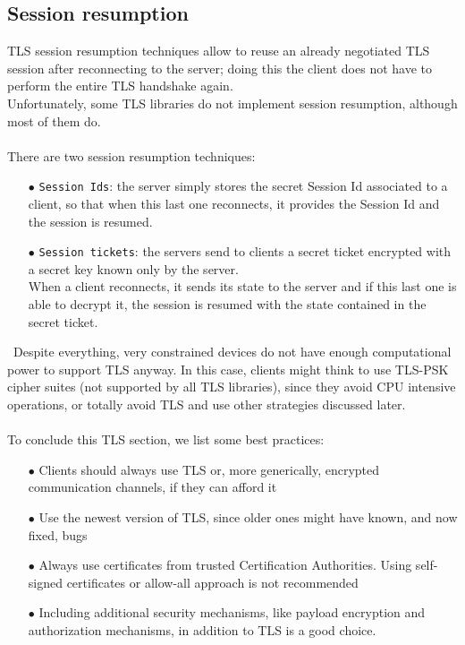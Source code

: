 \documentclass[12pt]{report}
\begin{document}
{{\subsection{Session resumption}
\bigskip
TLS session resumption techniques allow to reuse an already negotiated TLS session after reconnecting to the server; doing this the client does not have to perform the entire TLS handshake again.\\
Unfortunately, some TLS libraries do not implement session resumption, although most of them do.\\\\
There are two session resumption techniques:
\begin{itemize}
\setlength{\itemindent}{+4mm}
  \item[$\bullet$] \texttt{Session Ids}: the server simply stores the secret Session Id associated to a client, so that when this last one reconnects, it provides the Session Id and the session is resumed.
  \item[$\bullet$] \texttt{Session tickets}: the servers send to clients a secret ticket encrypted with a secret key known only by the server.\\
When a client reconnects, it sends its state to the server and if this last one is able to decrypt it, the session is resumed with the state contained in the secret ticket.
\end{itemize}\
Despite everything, very constrained devices do not have enough computational power to support TLS anyway. 
In this case, clients might think to use TLS-PSK cipher suites (not supported by all TLS libraries), since they avoid CPU intensive operations, or totally avoid TLS and use other strategies discussed later.\\\\

To conclude this TLS section, we list some best practices:

\begin{itemize}
\setlength{\itemindent}{+4mm}
  \item[$\bullet$] Clients should always use TLS or, more generically, encrypted communication channels, if they can afford it
  \item[$\bullet$] Use the newest version of TLS, since older ones might have known, and now fixed, bugs~\cite{sslvulns}
  \item[$\bullet$] Always use certificates from trusted Certification Authorities. Using self-signed certificates or allow-all approach is not recommended
  \item[$\bullet$] Including additional security mechanisms, like payload encryption and authorization mechanisms, in addition to TLS is a good choice.


\end{itemize}}}
\end{document}
